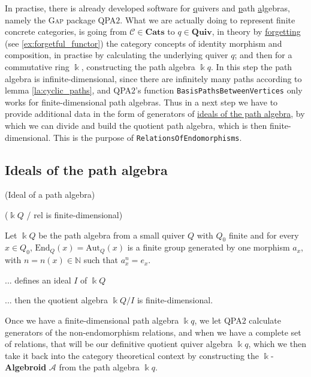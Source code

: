 In practise, there is already developed software for \ul{q}uivers and \ul{p}ath \ul{a}lgebras, namely the \textsc{Gap} package
\textsc{QPA$2$}.
What we are actually doing to represent finite concrete categories, is going from $\mathcal{C} \in \mathbf{Cats}$ to $q \in \mathbf{Quiv}$,
in theory by \ul{forgetting} (see \ref{ex:forgetful_functor}) the category concepts of identity morphism and composition, in practise by calculating the
underlying quiver $q$; and then for a commutative ring $\Bbbk$, constructing the path algebra $\Bbbk q$. In this step the path algebra
is infinite-dimensional, since there are infinitely many paths according to lemma \ref{la:cyclic_paths}, and \textsc{QPA$2$}'s function
\texttt{BasisPathsBetweenVertices} only works for finite-dimensional path algebras. Thus in a next step we have to provide
additional data in the form of generators of \ul{ideals of the path algebra}, by which we can divide and build the quotient path algebra,
which is then finite-dimensional. This is the purpose of \texttt{RelationsOfEndomorphisms}.

\subsection{Ideals of the path algebra}

\begin{definition}{(Ideal of a path algebra)}

\end{definition}

\begin{lemma}{($\Bbbk Q$ / rel is finite-dimensional)}

Let $\Bbbk Q$ be the path algebra from a small quiver $Q$ with $Q_{0}$ finite and for every $x \in Q_{0}$, $\mathrm{End}_{Q}(x) = \mathrm{Aut}_{Q}(x)$
is a finite group generated by one morphism $a_{x}$, with $n = n(x) \in \mathbb{N}$ such that $a_{x}^{n} = e_{x}$.



... defines an ideal $I$ of $\Bbbk Q$

... then the quotient algebra $\Bbbk Q / I$ is finite-dimensional.
\end{lemma}

Once we have a finite-dimensional path algebra $\Bbbk q$, we let \textsc{QPA$2$} calculate generators of the non-endomorphism relations,
and when we have a complete set of relations, that will be our definitive quotient quiver algebra $\Bbbk q$, which we then take it back into the category
theoretical context by constructing the $\Bbbk$-\textbf{Algebroid} $\mathcal{A}$ from the path algebra $\Bbbk q$.

